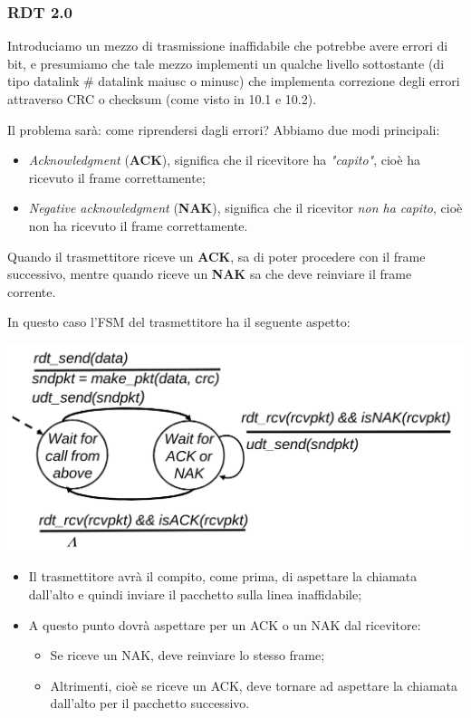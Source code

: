 \documentclass[a4paper,11pt]{article}
\begin{document}
\subsubsection{RDT 2.0}
Introduciamo un mezzo di trasmissione inaffidabile che potrebbe avere errori di bit, e presumiamo che tale mezzo implementi un qualche livello sottostante (di tipo datalink # datalink maiusc o minusc) che implementa correzione degli errori attraverso CRC o checksum (come visto in 10.1 e 10.2).

Il problema sarà: come riprendersi dagli errori? Abbiamo due modi principali:
\begin{itemize}
	\item \textit{Acknowledgment} (\textbf{ACK}), significa che il ricevitore ha \textit{"capito"}, cioè ha ricevuto il frame correttamente;
	\item \textit{Negative acknowledgment} (\textbf{NAK}), significa che il ricevitor \textit{non ha capito}, cioè non ha ricevuto il frame correttamente.
\end{itemize}

Quando il trasmettitore riceve un \textbf{ACK}, sa di poter procedere con il frame successivo, mentre quando riceve un \textbf{NAK} sa che deve reinviare il frame corrente.

In questo caso l'FSM del trasmettitore ha il seguente aspetto:
\begin{center}
	\includegraphics[scale=0.18]{../figures/rdt2fsm.png}
\end{center}
\begin{itemize}
	\item Il trasmettitore avrà il compito, come prima, di aspettare la chiamata dall'alto e quindi inviare il pacchetto sulla linea inaffidabile;
	\item A questo punto dovrà aspettare per un ACK o un NAK dal ricevitore:
		\begin{itemize}
			\item Se riceve un NAK, deve reinviare lo stesso frame;
			\item Altrimenti, cioè se riceve un ACK, deve tornare ad aspettare la chiamata dall'alto per il pacchetto successivo. 
		\end{itemize}
\end{itemize}
\end{document}

